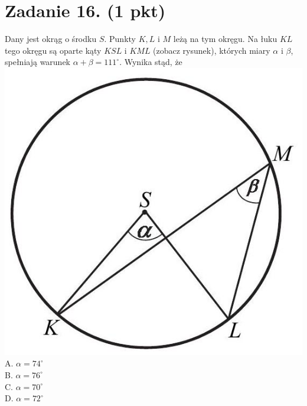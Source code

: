 \documentclass[10pt]{article}
\begin{document}
\section*{Zadanie 16. (1 pkt)}
Dany jest okrąg o środku \(S\). Punkty \(K, L\) i \(M\) leżą na tym okręgu. Na łuku \(K L\) tego okręgu są oparte kąty \(K S L\) i \(K M L\) (zobacz rysunek), których miary \(\alpha\) i \(\beta\), spełniają warunek \(\alpha+\beta=111^{\circ}\). Wynika stąd, że\\
\includegraphics[max width=\textwidth, center]{2024_11_21_9383c97fb44abf35abe9g-08(1)}\\
A. \(\alpha=74^{\circ}\)\\
B. \(\alpha=76^{\circ}\)\\
C. \(\alpha=70^{\circ}\)\\
D. \(\alpha=72^{\circ}\)
\end{document}

